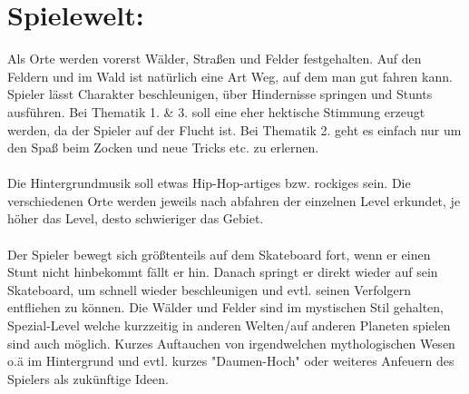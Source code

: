 \documentclass[paper=a4,fontsize=12pt,ngerman]{scrartcl}
\begin{document}
\section{Spielewelt:}
Als Orte werden vorerst Wälder, Straßen und Felder festgehalten. Auf den Feldern und
im Wald ist natürlich eine Art Weg, auf dem man gut fahren kann. Spieler lässt Charakter
beschleunigen, über Hindernisse springen und Stunts
ausführen. Bei Thematik 1. \& 3. soll eine eher hektische Stimmung erzeugt werden, da der
Spieler auf der Flucht ist. Bei Thematik 2. geht es einfach nur um den Spaß beim
Zocken und neue Tricks etc. zu erlernen.\\ \\
Die Hintergrundmusik soll etwas Hip-Hop-artiges bzw. rockiges sein. Die
verschiedenen Orte werden jeweils nach abfahren der einzelnen Level erkundet, je höher
das Level, desto schwieriger das Gebiet.\\ \\
Der Spieler bewegt sich größtenteils auf dem Skateboard fort, wenn er einen Stunt nicht
hinbekommt fällt er hin. Danach springt er direkt wieder auf sein Skateboard, um
schnell wieder beschleunigen und evtl. seinen Verfolgern entfliehen zu können.
Die Wälder und Felder sind im mystischen Stil gehalten, Spezial-Level welche kurzzeitig in
anderen Welten/auf anderen Planeten spielen sind auch möglich. Kurzes Auftauchen von
irgendwelchen mythologischen Wesen o.ä im Hintergrund und evtl. kurzes "Daumen-Hoch"
oder weiteres Anfeuern des Spielers als zukünftige Ideen.
\clearpage
\end{document}
